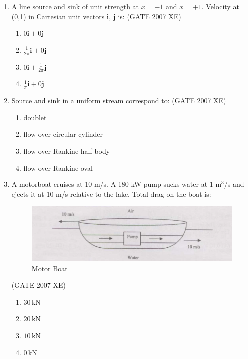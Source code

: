 \documentclass[journal,cmex10]{IEEEtran}
\theoremstyle{remark}
\numberwithin{equation}{enumi}
\numberwithin{figure}{enumi}
\begin{document}
\begin{enumerate}
\item A line source and sink of unit strength at $x=-1$ and $x=+1$. Velocity at (0,1) in Cartesian unit vectors $\mathbf{i}$, $\mathbf{j}$ is:  
\hfill{(GATE 2007 XE)}

\begin{multicols}{4}
\begin{enumerate}
    \item $0\mathbf{i} + 0\mathbf{j}$
    \item $\frac{1}{2\pi} \mathbf{i} + 0 \mathbf{j}$
    \item $0 \mathbf{i} + \frac{1}{2\pi} \mathbf{j}$
    \item $\frac{1}{\pi} \mathbf{i} + 0 \mathbf{j}$
\end{enumerate}
\end{multicols}


\item Source and sink in a uniform stream correspond to:  
\hfill{(GATE 2007 XE)}

\begin{multicols}{2}
\begin{enumerate}
    \item doublet
    \item flow over circular cylinder
    \item flow over Rankine half-body
    \item flow over Rankine oval
\end{enumerate}
\end{multicols}

\item A motorboat cruises at 10 m/s. A 180 kW pump sucks water at 1 m$^3$/s and ejects it at 10 m/s relative to the lake. Total drag on the boat is:  

\begin{figure}[htbp]
  \centering
  \includegraphics[width=1.0\columnwidth]{figs/D/fig3.png}
  \caption{Motor Boat}
  \label{fig:D/fig3.png}
\end{figure}
\hfill{(GATE 2007 XE)}
\begin{multicols}{4}
\begin{enumerate}
    \item $30\,\text{kN}$
    \item $20\,\text{kN}$
    \item $10\,\text{kN}$
    \item $0\,\text{kN}$
\end{enumerate}
\end{multicols}


\end{enumerate}
\end{document}
